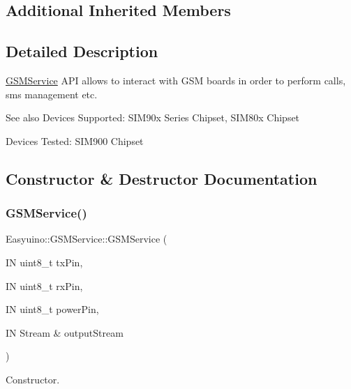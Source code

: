 \subsection*{Additional Inherited Members}


\subsection{Detailed Description}
\hyperlink{class_easyuino_1_1_g_s_m_service}{G\+S\+M\+Service} A\+PI allows to interact with G\+SM boards in order to perform calls, sms management etc. 

\begin{DoxySeeAlso}{See also}
Devices Supported\+: S\+I\+M90x Series Chipset, S\+I\+M80x Chipset 

Devices Tested\+: S\+I\+M900 Chipset 
\end{DoxySeeAlso}


\subsection{Constructor \& Destructor Documentation}
\mbox{\label{class_easyuino_1_1_g_s_m_service_ad8700c921a8f3ce267369e9843853be1}} 
\subsubsection{\texorpdfstring{G\+S\+M\+Service()}{GSMService()}\hspace{0.1cm}{\footnotesize\ttfamily [1/2]}}
{\footnotesize\ttfamily Easyuino\+::\+G\+S\+M\+Service\+::\+G\+S\+M\+Service (\begin{DoxyParamCaption}\item[{IN uint8\+\_\+t}]{tx\+Pin,  }\item[{IN uint8\+\_\+t}]{rx\+Pin,  }\item[{IN uint8\+\_\+t}]{power\+Pin,  }\item[{IN Stream \&}]{output\+Stream }\end{DoxyParamCaption})}



Constructor. 


